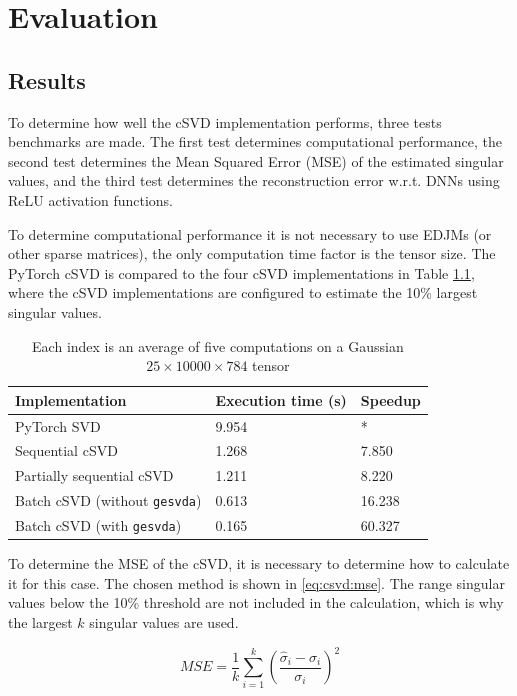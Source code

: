 \chapter{Evaluation}

\section{Results}

To determine how well the cSVD implementation performs, three tests benchmarks are made. The first test determines computational performance, the second test determines the Mean Squared Error (MSE) of the estimated singular values, and the third test determines the reconstruction error w.r.t. DNNs using ReLU activation functions.

To determine computational performance it is not necessary to use EDJMs (or other sparse matrices), the only computation time factor is the tensor size. The PyTorch cSVD is compared to the four cSVD implementations in Table \ref{tab:csvd:performance}, where the cSVD implementations are configured to estimate the 10\% largest singular values.

\begin{table}[H]
  \centering
    \begin{tabular}{|l|l|l|} \hline
      Implementation & Execution time (s) & Speedup \\ \hline
      PyTorch SVD & 9.954 & * \\ \hline
      Sequential cSVD & 1.268  & 7.850 \\ \hline
      Partially sequential cSVD & 1.211  & 8.220 \\ \hline
      Batch cSVD (without \texttt{gesvda}) & 0.613 & 16.238 \\ \hline
      Batch cSVD (with \texttt{gesvda}) & 0.165 & 60.327 \\ \hline
    \end{tabular}
    \caption{Each index is an average of five computations on a Gaussian $25 \times 10000 \times 784$ tensor}
    \label{tab:csvd:performance}
\end{table}

To determine the MSE of the cSVD, it is necessary to determine how to calculate it for this case. The chosen method is shown in \eqref{eq:csvd:mse}. The range singular values below the 10\% threshold are not included in the calculation, which is why the largest $k$ singular values are used.

\begin{equation}
  \label{eq:csvd:mse}
    MSE = \frac{1}{k} \sum_{i=1}^{k} \left ( \frac{\hat \sigma_i - \sigma_i}{\sigma_i} \right )^2
\end{equation}

